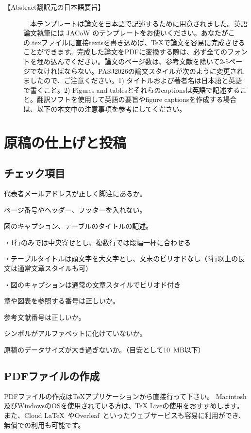 \documentclass{PASJ2026}
\begin{document}
【Abstract翻訳元の日本語要旨】
\begin{description}
\item[]
{
　本テンプレートは論文を日本語で記述するために用意されました。英語論文執筆には JACoW のテンプレートをお使いください。あなたがこの.texファイルに直接textsを書き込めば、{\TeX}で論文を容易に完成させることができます。完成した論文をPDFに変換する際は、必ず全てのフォントを埋め込んでください。論文のページ数は、参考文献を除いて2-5ページでなければならない。PASJ2026の論文スタイルが次のように変更されましたので、ご注意ください。1) タイトルおよび著者名は日本語と英語で書くこと。2) Figures and tablesとそれらのcaptionsは英語で記述すること。翻訳ソフトを使用して英語の要旨やfigure captionsを作成する場合は、以下の本文中の注意事項を参考にしてください。%
}
\end{description}
%
\section{原稿の仕上げと投稿}
%
\subsection{チェック項目}
%
\begin{Itemize}
%
\item 代表者メールアドレスが正しく脚注にあるか。
%
\item ページ番号やヘッダー、フッターを入れない。
%
\item 図のキャプション、テーブルのタイトルの記述。

・1行のみでは中央寄せとし、複数行では段幅一杯に合わせる

・テーブルタイトルは頭文字を大文字とし、文末のピリオドなし（3行以上の長文は通常文章スタイルも可）

・図のキャプションは通常の文章スタイルでピリオド付き
%
\item 章や図表を参照する番号は正しいか。
%
\item 参考文献番号は正しいか。
%
\item シンボルがアルファベットに化けていないか。
%
\item 原稿のデータサイズが大き過ぎないか。（目安として10~MB以下）
%
\end{Itemize}
%
\subsection{PDFファイルの作成}
PDFファイルの作成は{\TeX}アプリケーションから直接行って下さい。%
Macintosh及びWindowsのOSを使用されている方は、TeX Live\cite{MacTeX,WindowsTeX}の使用をおすすめします。
また、Cloud LaTeX~\cite{Cloudlatex}やOverleaf~\cite{Overleaf}といったウェブサービスも容易に利用ができ、無償での利用も可能です。
%
\end{document}
